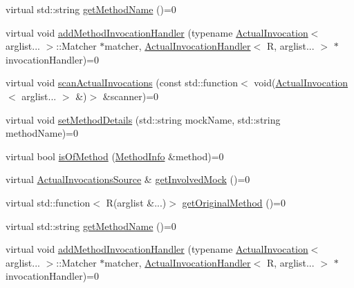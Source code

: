 \begin{DoxyCompactItemize}
\item 
virtual std\+::string \mbox{\hyperlink{structfakeit_1_1MethodMockingContext_1_1Context_ab5f7cc2c8d00214baacaad4c49ccf17f}{get\+Method\+Name}} ()=0
\item 
virtual void \mbox{\hyperlink{structfakeit_1_1MethodMockingContext_1_1Context_a87b3a2d95daf8aaa2ae56b49e032c275}{add\+Method\+Invocation\+Handler}} (typename \mbox{\hyperlink{structfakeit_1_1ActualInvocation}{Actual\+Invocation}}$<$ arglist... $>$\+::Matcher $\ast$matcher, \mbox{\hyperlink{structfakeit_1_1ActualInvocationHandler}{Actual\+Invocation\+Handler}}$<$ R, arglist... $>$ $\ast$invocation\+Handler)=0
\item 
virtual void \mbox{\hyperlink{structfakeit_1_1MethodMockingContext_1_1Context_a89b30ea54bcf5e55c19696f77ad8423b}{scan\+Actual\+Invocations}} (const std\+::function$<$ void(\mbox{\hyperlink{structfakeit_1_1ActualInvocation}{Actual\+Invocation}}$<$ arglist... $>$ \&)$>$ \&scanner)=0
\item 
virtual void \mbox{\hyperlink{structfakeit_1_1MethodMockingContext_1_1Context_a9eb0cf6ed84ea4bd63333503bd6bdc1a}{set\+Method\+Details}} (std\+::string mock\+Name, std\+::string method\+Name)=0
\item 
virtual bool \mbox{\hyperlink{structfakeit_1_1MethodMockingContext_1_1Context_a126835068d4a7bcbf01f47080e690510}{is\+Of\+Method}} (\mbox{\hyperlink{structfakeit_1_1MethodInfo}{Method\+Info}} \&method)=0
\item 
virtual \mbox{\hyperlink{structfakeit_1_1ActualInvocationsSource}{Actual\+Invocations\+Source}} \& \mbox{\hyperlink{structfakeit_1_1MethodMockingContext_1_1Context_aab7f9487475b01f85e81b76cdf6c4860}{get\+Involved\+Mock}} ()=0
\item 
virtual std\+::function$<$ R(arglist \&...)$>$ \mbox{\hyperlink{structfakeit_1_1MethodMockingContext_1_1Context_a1878bb27937f4984d5c43e20c2b0b626}{get\+Original\+Method}} ()=0
\item 
virtual std\+::string \mbox{\hyperlink{structfakeit_1_1MethodMockingContext_1_1Context_ab5f7cc2c8d00214baacaad4c49ccf17f}{get\+Method\+Name}} ()=0
\item 
virtual void \mbox{\hyperlink{structfakeit_1_1MethodMockingContext_1_1Context_a87b3a2d95daf8aaa2ae56b49e032c275}{add\+Method\+Invocation\+Handler}} (typename \mbox{\hyperlink{structfakeit_1_1ActualInvocation}{Actual\+Invocation}}$<$ arglist... $>$\+::Matcher $\ast$matcher, \mbox{\hyperlink{structfakeit_1_1ActualInvocationHandler}{Actual\+Invocation\+Handler}}$<$ R, arglist... $>$ $\ast$invocation\+Handler)=0

\end{DoxyCompactItemize}
